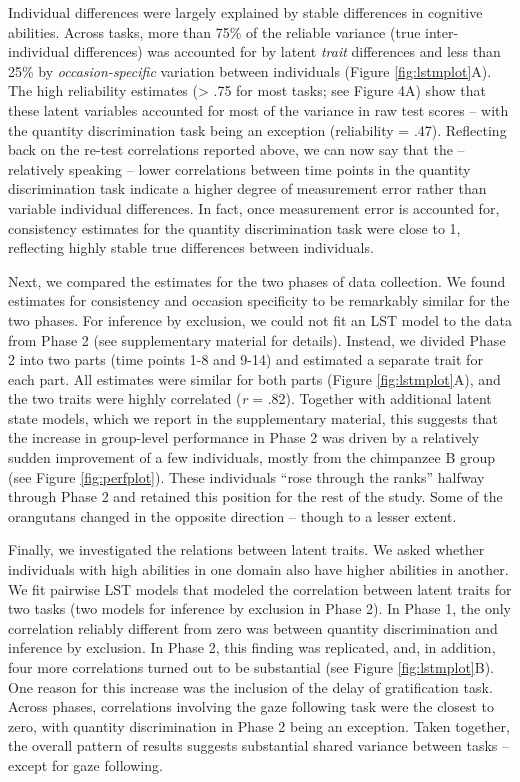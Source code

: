 \documentclass[
  man,floatsintext]{apa6}
\begin{document}
Individual differences were largely explained by stable differences in cognitive abilities. Across tasks, more than 75\% of the reliable variance (true inter-individual differences) was accounted for by latent \emph{trait} differences and less than 25\% by \emph{occasion-specific} variation between individuals (Figure \ref{fig:lstmplot}A). The high reliability estimates (\textgreater{} .75 for most tasks; see Figure 4A) show that these latent variables accounted for most of the variance in raw test scores -- with the quantity discrimination task being an exception (reliability = .47). Reflecting back on the re-test correlations reported above, we can now say that the -- relatively speaking -- lower correlations between time points in the quantity discrimination task indicate a higher degree of measurement error rather than variable individual differences. In fact, once measurement error is accounted for, consistency estimates for the quantity discrimination task were close to 1, reflecting highly stable true differences between individuals.

Next, we compared the estimates for the two phases of data collection. We found estimates for consistency and occasion specificity to be remarkably similar for the two phases. For inference by exclusion, we could not fit an LST model to the data from Phase 2 (see supplementary material for details). Instead, we divided Phase 2 into two parts (time points 1-8 and 9-14) and estimated a separate trait for each part. All estimates were similar for both parts (Figure \ref{fig:lstmplot}A), and the two traits were highly correlated (\emph{r} = .82). Together with additional latent state models, which we report in the supplementary material, this suggests that the increase in group-level performance in Phase 2 was driven by a relatively sudden improvement of a few individuals, mostly from the chimpanzee B group (see Figure \ref{fig:perfplot}). These individuals ``rose through the ranks'' halfway through Phase 2 and retained this position for the rest of the study. Some of the orangutans changed in the opposite direction -- though to a lesser extent.

Finally, we investigated the relations between latent traits. We asked whether individuals with high abilities in one domain also have higher abilities in another. We fit pairwise LST models that modeled the correlation between latent traits for two tasks (two models for inference by exclusion in Phase 2). In Phase 1, the only correlation reliably different from zero was between quantity discrimination and inference by exclusion. In Phase 2, this finding was replicated, and, in addition, four more correlations turned out to be substantial (see Figure \ref{fig:lstmplot}B). One reason for this increase was the inclusion of the delay of gratification task. Across phases, correlations involving the gaze following task were the closest to zero, with quantity discrimination in Phase 2 being an exception. Taken together, the overall pattern of results suggests substantial shared variance between tasks -- except for gaze following.
\end{document}
